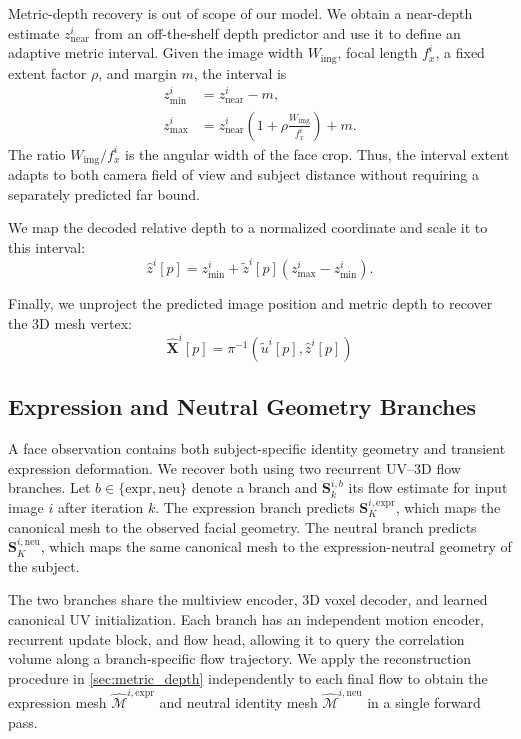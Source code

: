 Metric-depth recovery is out of scope of our model. We obtain a near-depth
estimate $z_{\mathrm{near}}^{i}$ from an off-the-shelf depth predictor and use
it to define an adaptive metric interval. Given the image width
$W_{\mathrm{img}}$, focal length $f_x^{i}$, a fixed extent factor $\rho$, and
margin $m$, the interval is
\begin{align}
    z_{\min}^{i}
        &= z_{\mathrm{near}}^{i}-m, \\
    z_{\max}^{i}
        &= z_{\mathrm{near}}^{i}
        \left(1+\rho\frac{W_{\mathrm{img}}}{f_x^{i}}\right)+m.
    \label{eq:depth_bounds}
\end{align}
The ratio $W_{\mathrm{img}}/f_x^{i}$ is the angular width of the face crop.
Thus, the interval extent adapts to both camera field of view and subject
distance without requiring a separately predicted far bound.

We map the decoded relative depth to a normalized coordinate and scale it to
this interval:
\begin{equation}
    \hat z^{i}[p]
    = z_{\min}^{i}
      +\tilde z^{i}[p](z_{\max}^{i}-z_{\min}^{i}).
    \label{eq:relative_to_metric}
\end{equation}

Finally, we unproject the predicted image position and metric depth to recover
the 3D mesh vertex:
\begin{equation}
    \hat{\mathbf{X}}^{i}[p]
    = \pi^{-1}( \tilde u^{i}[p], \hat z^{i}[p])
    \label{eq:unprojection}
\end{equation}


\subsection{Expression and Neutral Geometry Branches}
\label{sec:dual_branch}

A face observation contains both subject-specific identity geometry and
transient expression deformation. We recover both using two recurrent UV--3D
flow branches. Let $b\in\{\mathrm{expr},\mathrm{neu}\}$ denote a branch and
$\mathbf{S}^{i,b}_{k}$ its flow estimate for input image $i$ after iteration
$k$. The expression branch predicts $\mathbf{S}^{i,\mathrm{expr}}_{K}$, which
maps the canonical mesh to the observed facial geometry. The neutral branch
predicts $\mathbf{S}^{i,\mathrm{neu}}_{K}$, which maps the same canonical mesh
to the expression-neutral geometry of the subject.

The two branches share the multiview encoder, 3D voxel decoder, and learned
canonical UV initialization. Each branch has an independent motion encoder,
recurrent update block, and flow head, allowing it to query the correlation
volume along a branch-specific flow trajectory. We apply the reconstruction
procedure in \cref{sec:metric_depth} independently to each final flow to obtain
the expression mesh $\hat{\mathcal{M}}^{i,\mathrm{expr}}$ and neutral identity
mesh $\hat{\mathcal{M}}^{i,\mathrm{neu}}$ in a single forward pass.



